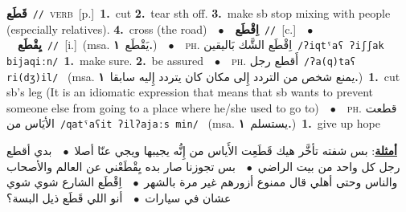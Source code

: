 \documentclass[10pt,a4paper,twoside]{article} %
\begin{document}
\begin{multicols}{2}
{\setlength\topsep{0pt}\textbf{\foreignlanguage{arabic}{قَطَع}}\ {\color{gray}\texttt{//}\color{black}}\ \textsc{verb}\ [p.]\ \textbf{1.}~cut  \textbf{2.}~tear sth off.  \textbf{3.}~make sb stop mixing with people (especially relatives).  \textbf{4.}~cross (the road)\ \ $\bullet$\ \ \setlength\topsep{0pt}\textbf{\foreignlanguage{arabic}{اِقْطَع}}\ {\color{gray}\texttt{//}\color{black}}\ [c.]\ \ $\bullet$\ \ \setlength\topsep{0pt}\textbf{\foreignlanguage{arabic}{يِقْطَع}}\ {\color{gray}\texttt{//}\color{black}}\ [i.]\ \color{gray}(msa. \foreignlanguage{arabic}{يَقْطَع}~\foreignlanguage{arabic}{\textbf{١.}})\color{black}\ \ $\bullet$\ \ \textsc{ph.} \color{gray} \foreignlanguage{arabic}{اِقْطَع الشَّك بَاليقين}\color{black}\ {\color{gray}\texttt{/{\sffamily ʔiqtˤaʕ ʔiʃʃak bijaqiːn}/}\color{black}}\ \textbf{1.}~make sure.  \textbf{2.}~be assured\ \ $\bullet$\ \ \textsc{ph.} \color{gray} \foreignlanguage{arabic}{أَقطع رجل}\color{black}\ {\color{gray}\texttt{/{\sffamily ʔa(q)taʕ ri(dʒ)il}/}\color{black}}\ \color{gray} (msa. \foreignlanguage{arabic}{يمنع شخص من التردد إِلى مكان كان يتردد إِليه سابقا}~\foreignlanguage{arabic}{\textbf{١.}})\color{black}\ \textbf{1.}~cut sb's leg (It is an idiomatic expression that means that sb wants to prevent someone else from going to a place where he/she used to go to)\ \ $\bullet$\ \ \textsc{ph.} \color{gray} \foreignlanguage{arabic}{قطعت الأيَاس من}\color{black}\ {\color{gray}\texttt{/{\sffamily qatˤaʕit ʔilʔajaːs min}/}\color{black}}\ \color{gray} (msa. \foreignlanguage{arabic}{يستسلم}~\foreignlanguage{arabic}{\textbf{١.}})\color{black}\ \textbf{1.}~give up hope\  \begin{flushright}\color{gray}\foreignlanguage{arabic}{\textbf{\underline{\foreignlanguage{arabic}{أمثلة}}}: بس شفته تأخَّر هيك قَطَعِت الأَياس من إِنُّه يجيبها ويجي عنّا أصلا\ $\bullet$\ \  بدي أقطع رجل كل واحد من بيت الراضي\ $\bullet$\ \  بس تجوزنا صار بده يِقْطَعْني عن العالم والأصحاب والناس وحتى أهلي قال ممنوع أزورهم غير مرة بالشهر\ $\bullet$\ \  اِقْطَع الشارع شوي شوي عشان في سيارات\ $\bullet$\ \  أنو اللي قَطَع ذيل البسة؟}\end{flushright}\color{black}} \vspace{2mm}


\end{multicols}
\end{document}
